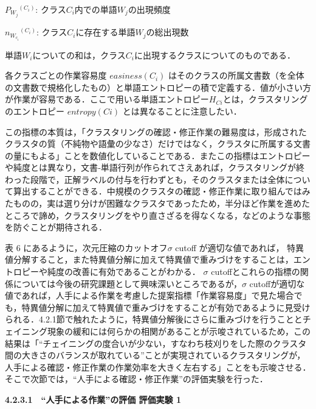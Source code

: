 \documentclass[japanese]{jnlp_1.4}
\begin{document}
\noindent
$P_{W_{j}}{}^{(C_{i})}$: クラス$C_{i}$内での単語$W_{j}$の出現頻度

\noindent
$n_{W_{c_{i}}}{}^{(C_{i})}$: クラス$C_{i}$に存在する単語$W_{j}$の総出現数

単語$W_{i}$についての和は，クラス$C_{i}$に出現するクラスについてのものである．

各クラスごとの作業容易度 $\mathit{easiness}(C_{i})$ はそのクラスの所属文書数（を全体の文書数で規格化したもの）と単語エントロピーの積で定義する．値が小さい方が作業が容易である．ここで用いる単語エントロピー$H_{Ci}$とは，クラスタリングのエントロピー $\mathit{entropy}(Ci)$ とは異なることに注意したい．

この指標の本質は，「クラスタリングの確認・修正作業の難易度は，形成されたクラスタの質（不純物や語彙の少なさ）だけではなく，クラスタに所属する文書の量にもよる」ことを数値化していることである．またこの指標はエントロピーや純度とは異なり，文書‐単語行列が作られてさえあれば，クラスタリングが終わった段階で，正解ラベルの付与を行わずとも，そのクラスタまたは全体について算出することができる．中規模のクラスタの確認・修正作業に取り組んではみたものの，実は選り分けが困難なクラスタであったため，半分ほど作業を進めたところで諦め，クラスタリングをやり直さざるを得なくなる，などのような事態を防ぐことが期待される．

表 6 にあるように，次元圧縮のカットオフ$\sigma$ cutoff が適切な値であれば，
特異値分解すること，また特異値分解に加えて特異値で重みづけをすることは，エントロピーや純度の改善に有効であることがわかる．
$\sigma$ cutoffとこれらの指標の関係については今後の研究課題として興味深いところであるが，$\sigma$ cutoffが適切な値であれば，人手による作業を考慮した提案指標「作業容易度」で見た場合でも，特異値分解に加えて特異値で重みづけをすることが有効であるように見受けられる．4.2.1節で触れたように，特異値分解後にさらに重みづけを行うこととチェイニング現象の緩和には何らかの相関があることが示唆されているため，この結果は「``チェイニングの度合いが少ない，すなわち枝刈りをした際のクラスタ間の大きさのバランスが取れている''ことが実現されているクラスタリングが，人手による確認・修正作業の作業効率を大きく左右する」ことをも示唆させる．そこで次節では，``人手による確認・修正作業''の評価実験を行った．


\noindent\textbf{4.2.3.1　``人手による作業''の評価 評価実験 1}
\end{document}
